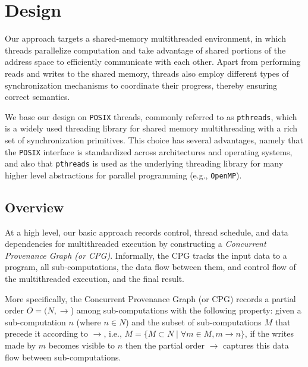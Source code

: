 \section{Design}
\label{sec:algorithms}

Our approach targets a shared-memory multithreaded environment, in which threads parallelize computation and take 
advantage of shared portions of the address space to efficiently communicate with each other. Apart from performing reads 
and writes to the shared memory, threads also employ different types of synchronization mechanisms to 
coordinate their progress, thereby ensuring correct semantics. 

We base our design on {\tt POSIX} threads, commonly referred to as
{\tt pthreads}, which is a widely used threading library for shared memory
multithreading with a rich set of synchronization primitives.  This
choice has several advantages, namely that the {\tt POSIX} interface
is standardized across architectures and operating systems, and also that {\tt pthreads} is used as the underlying threading
library for many higher level abstractions for parallel programming
(e.g., {\tt OpenMP}).



\subsection{Overview}
At a high level, our basic approach records control, thread schedule, and data dependencies for multithreaded execution by constructing a {\em Concurrent Provenance Graph (or CPG)}. Informally, the CPG tracks the input data to a program, all sub-computations, the data flow between them, and control flow of the multithreaded execution, and the final result. 

More specifically, the Concurrent Provenance Graph (or CPG) records a partial order $O = (N, \rightarrow$) among sub-computations with the following property: given a sub-computation $n$ (where $n \in N $)  and the subset of sub-computations $M$ that precede it according to $\rightarrow$, i.e., $M = \{M \subset N \mid \forall m \in M, m \rightarrow n\}$, if the writes made by $m$ becomes visible to $n$ then the partial order $\rightarrow$ captures this data flow between sub-computations.



